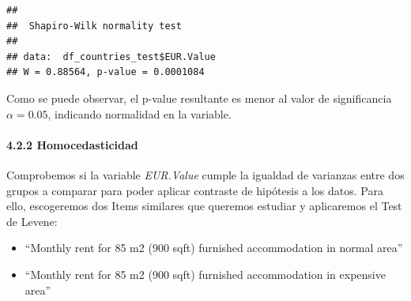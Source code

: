 \documentclass[
]{article}
\newenvironment{Shaded}{\begin{snugshade}}{\end{snugshade}}
\newcommand{\CommentTok}[1]{\textcolor[rgb]{0.56,0.35,0.01}{\textit{#1}}}
\newcommand{\FunctionTok}[1]{\textcolor[rgb]{0.13,0.29,0.53}{\textbf{#1}}}
\newcommand{\NormalTok}[1]{#1}
\newcommand{\OtherTok}[1]{\textcolor[rgb]{0.56,0.35,0.01}{#1}}
\newcommand{\SpecialCharTok}[1]{\textcolor[rgb]{0.81,0.36,0.00}{\textbf{#1}}}
\newcommand{\StringTok}[1]{\textcolor[rgb]{0.31,0.60,0.02}{#1}}
\providecommand{\tightlist}{%
  \setlength{\itemsep}{0pt}\setlength{\parskip}{0pt}}
\begin{document}
\begin{Shaded}
\end{Shaded}

\begin{verbatim}
## 
##  Shapiro-Wilk normality test
## 
## data:  df_countries_test$EUR.Value
## W = 0.88564, p-value = 0.0001084
\end{verbatim}

Como se puede observar, el p-value resultante es menor al valor de
significancia \(\alpha=0.05\), indicando normalidad en la variable.

\hypertarget{homocedasticidad}{%
\paragraph{4.2.2 Homocedasticidad}\label{homocedasticidad}}

\hfill\break

Comprobemos si la variable \emph{EUR.Value} cumple la igualdad de
varianzas entre dos grupos a comparar para poder aplicar contraste de
hipótesis a los datos. Para ello, escogeremos dos Items similares que
queremos estudiar y aplicaremos el Test de Levene:

\begin{itemize}
\tightlist
\item
  ``Monthly rent for 85 m2 (900 sqft) furnished accommodation in normal
  area''
\item
  ``Monthly rent for 85 m2 (900 sqft) furnished accommodation in
  expensive area''
\end{itemize}
\end{document}
